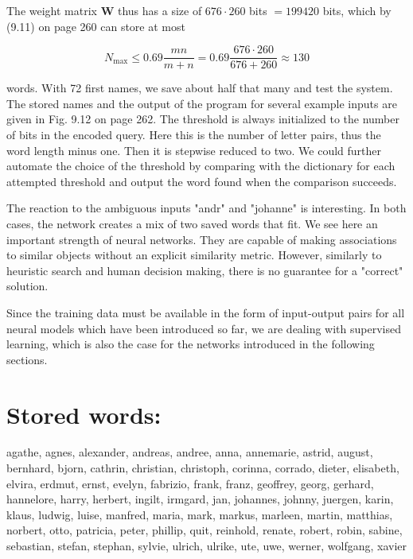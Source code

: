 \documentclass[10pt]{article}
\begin{document}
The weight matrix $\boldsymbol{W}$ thus has a size of $676 \cdot 260$ bits $=199420$ bits, which by (9.11) on page 260 can store at most

$$
N_{\max } \leq 0.69 \frac{m n}{m+n}=0.69 \frac{676 \cdot 260}{676+260} \approx 130
$$

words. With 72 first names, we save about half that many and test the system. The stored names and the output of the program for several example inputs are given in Fig. 9.12 on page 262. The threshold is always initialized to the number of bits in the encoded query. Here this is the number of letter pairs, thus the word length minus one. Then it is stepwise reduced to two. We could further automate the choice of the threshold by comparing with the dictionary for each attempted threshold and output the word found when the comparison succeeds.

The reaction to the ambiguous inputs "andr" and "johanne" is interesting. In both cases, the network creates a mix of two saved words that fit. We see here an important strength of neural networks. They are capable of making associations to similar objects without an explicit similarity metric. However, similarly to heuristic search and human decision making, there is no guarantee for a "correct" solution.

Since the training data must be available in the form of input-output pairs for all neural models which have been introduced so far, we are dealing with supervised learning, which is also the case for the networks introduced in the following sections.

\section*{Stored words:
}
agathe, agnes, alexander, andreas, andree, anna, annemarie, astrid, august, bernhard, bjorn, cathrin, christian, christoph, corinna, corrado, dieter, elisabeth, elvira, erdmut, ernst, evelyn, fabrizio, frank, franz, geoffrey, georg, gerhard, hannelore, harry, herbert, ingilt, irmgard, jan, johannes, johnny, juergen, karin, klaus, ludwig, luise, manfred, maria, mark, markus, marleen, martin, matthias, norbert, otto, patricia, peter, phillip, quit, reinhold, renate, robert, robin, sabine, sebastian, stefan, stephan, sylvie, ulrich, ulrike, ute, uwe, werner, wolfgang, xavier
\end{document}

